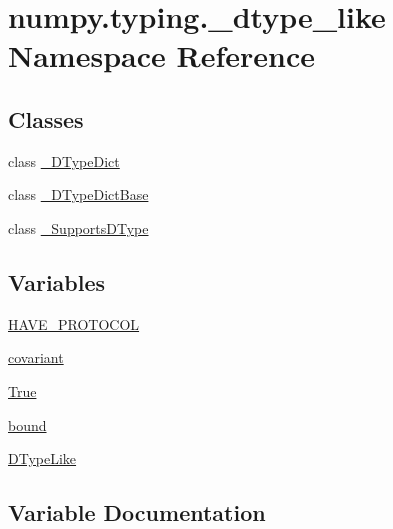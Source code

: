 \hypertarget{namespacenumpy_1_1typing_1_1__dtype__like}{}\section{numpy.\+typing.\+\_\+dtype\+\_\+like Namespace Reference}
\label{namespacenumpy_1_1typing_1_1__dtype__like}
\subsection*{Classes}
\begin{DoxyCompactItemize}
\item 
class \hyperlink{classnumpy_1_1typing_1_1__dtype__like_1_1__DTypeDict}{\+\_\+\+D\+Type\+Dict}
\item 
class \hyperlink{classnumpy_1_1typing_1_1__dtype__like_1_1__DTypeDictBase}{\+\_\+\+D\+Type\+Dict\+Base}
\item 
class \hyperlink{classnumpy_1_1typing_1_1__dtype__like_1_1__SupportsDType}{\+\_\+\+Supports\+D\+Type}
\end{DoxyCompactItemize}
\subsection*{Variables}
\begin{DoxyCompactItemize}
\item 
\hyperlink{namespacenumpy_1_1typing_1_1__dtype__like_a6e98fbd8ebaa0cb133fd42ad13c3dc28}{H\+A\+V\+E\+\_\+\+P\+R\+O\+T\+O\+C\+OL}
\item 
\hyperlink{namespacenumpy_1_1typing_1_1__dtype__like_a15986b62611b1e8eb961a91ea8b6c456}{covariant}
\item 
\hyperlink{namespacenumpy_1_1typing_1_1__dtype__like_a1602eb5c39d55fbe67fc2b880f68a379}{True}
\item 
\hyperlink{namespacenumpy_1_1typing_1_1__dtype__like_a8f79f412885b948bb5c43576778f6097}{bound}
\item 
\hyperlink{namespacenumpy_1_1typing_1_1__dtype__like_a8587459feb8b284d30d180cfeff7ffbc}{D\+Type\+Like}
\end{DoxyCompactItemize}


\subsection{Variable Documentation}
\mbox{\label{namespacenumpy_1_1typing_1_1__dtype__like_a8f79f412885b948bb5c43576778f6097}} 
